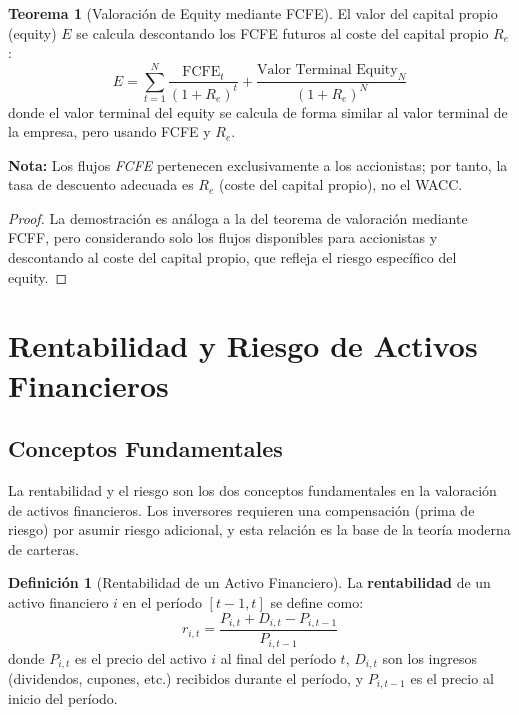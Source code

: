 \documentclass[12pt,a4paper]{article}
\theoremstyle{definition}
\newtheorem{definicion}{Definición}[section]
\newtheorem{teorema}{Teorema}[section]
\begin{document}
\begin{teorema}[Valoración de Equity mediante FCFE]
El valor del capital propio (equity) $E$ se calcula descontando los FCFE futuros al coste del capital propio $R_e$:
\begin{equation}
E = \sum_{t=1}^{N} \frac{\text{FCFE}_t}{(1 + R_e)^t} + \frac{\text{Valor Terminal Equity}_N}{(1 + R_e)^N}
\end{equation}
donde el valor terminal del equity se calcula de forma similar al valor terminal de la empresa, pero usando FCFE y $R_e$.
\end{teorema}

\textbf{Nota:} Los flujos \textit{FCFE} pertenecen exclusivamente a los accionistas; por tanto, la tasa de descuento adecuada es $R_e$ (coste del capital propio), no el WACC.

\begin{proof}
La demostración es análoga a la del teorema de valoración mediante FCFF, pero considerando solo los flujos disponibles para accionistas y descontando al coste del capital propio, que refleja el riesgo específico del equity.
\end{proof}

\section{Rentabilidad y Riesgo de Activos Financieros}

\subsection{Conceptos Fundamentales}

La rentabilidad y el riesgo son los dos conceptos fundamentales en la valoración de activos financieros. Los inversores requieren una compensación (prima de riesgo) por asumir riesgo adicional, y esta relación es la base de la teoría moderna de carteras.

\begin{definicion}[Rentabilidad de un Activo Financiero]
La \textbf{rentabilidad} de un activo financiero $i$ en el período $[t-1, t]$ se define como:
\begin{equation}
r_{i,t} = \frac{P_{i,t} + D_{i,t} - P_{i,t-1}}{P_{i,t-1}}
\end{equation}
donde $P_{i,t}$ es el precio del activo $i$ al final del período $t$, $D_{i,t}$ son los ingresos (dividendos, cupones, etc.) recibidos durante el período, y $P_{i,t-1}$ es el precio al inicio del período.
\end{definicion}
\end{document}

